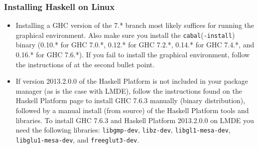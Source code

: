 \documentclass[]{article}
\begin{document}
\subsubsection{Installing Haskell on Linux}
\begin{itemize}
  \item Installing a GHC version of the 7.* branch most likely suffices for running the graphical environment. Also make sure you install the \texttt{cabal}(\texttt{-install}) binary (0.10.* for GHC 7.0.*, 0.12.* for GHC 7.2.*, 0.14.* for GHC 7.4.*, and 0.16.* for GHC 7.6.*). If you fail to install the graphical environment, follow the instructions of at the second bullet point.
  \item If version 2013.2.0.0 of the Haskell Platform is not included in your package manager (as is the case with LMDE), follow the instructions found on the Haskell Platform page to install GHC 7.6.3 manually (binary distribution), followed by a manual install (from source) of the Haskell Platform tools and libraries.
  To install GHC 7.6.3 and Haskell Platform 2013.2.0.0 on LMDE you need the following libraries: \texttt{libgmp-dev}, \texttt{libz-dev}, \texttt{libgl1-mesa-dev}, \texttt{libglu1-mesa-dev}, and \texttt{freeglut3-dev}.
\end{itemize}
\end{document}
